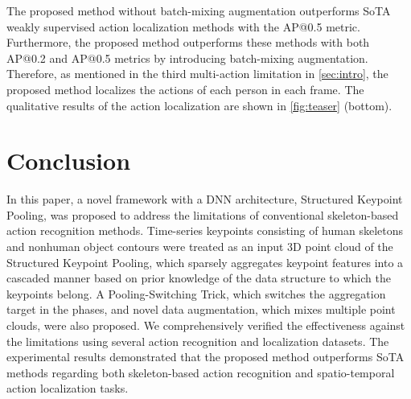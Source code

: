 \documentclass[10pt,twocolumn,letterpaper]{article}
\begin{document}
The proposed method without batch-mixing augmentation outperforms SoTA weakly supervised action localization methods with the AP@0.5 metric.
Furthermore, the proposed method outperforms these methods with both AP@0.2 and AP@0.5 metrics by introducing batch-mixing augmentation.
Therefore, as mentioned in the third multi-action limitation in \cref{sec:intro}, the proposed method localizes the actions of each person in each frame.
The qualitative results of the action localization are shown in \cref{fig:teaser} (bottom).


\section{Conclusion}
In this paper, a novel framework with a DNN architecture, Structured Keypoint Pooling, was proposed to address the limitations of conventional skeleton-based action recognition methods.
Time-series keypoints consisting of human skeletons and nonhuman object contours were treated as an input 3D point cloud of the Structured Keypoint Pooling, which sparsely aggregates keypoint features into a cascaded manner based on prior knowledge of the data structure to which the keypoints belong.
A Pooling-Switching Trick, which switches the aggregation target in the phases, and novel data augmentation, which mixes multiple point clouds, were also proposed.
We comprehensively verified the effectiveness against the limitations using several action recognition and localization datasets.
The experimental results demonstrated that the proposed method outperforms SoTA methods regarding both skeleton-based action recognition and spatio-temporal action localization tasks.

{\small


}
\end{document}
